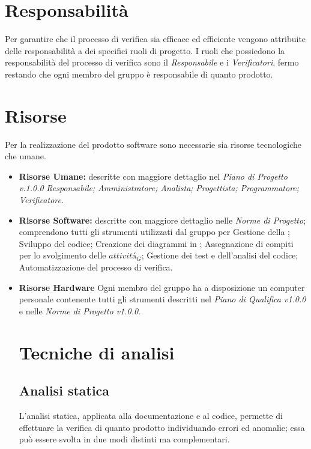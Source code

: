\section{Responsabilità}
Per garantire che il processo di verifica sia efficace ed efficiente vengono attribuite delle responsabilità a dei specifici ruoli di progetto.
I ruoli che possiedono la responsabilità del processo di verifica sono il \textit{Responsabile} e i \textit{Verificatori}, fermo restando che ogni membro del gruppo è responsabile di quanto prodotto.
\section{Risorse} Per la realizzazione del prodotto software sono necessarie sia risorse tecnologiche che umane.
\begin{itemize}
	\item \textbf{Risorse Umane:} descritte con maggiore dettaglio nel \textit{Piano di Progetto v.1.0.0}
	\subitem	\textit{Responsabile;}
	\subitem	\textit{Amministratore;}
	\subitem	\textit{Analista;}
	\subitem	\textit{Progettista;}
	\subitem	\textit{Programmatore;}
	\subitem	\textit{Verificatore.}
	
	\item \textbf{Risorse Software:} descritte con maggiore dettaglio nelle \textit{Norme di Progetto}; comprendono tutti gli strumenti utilizzati dal gruppo per
	\subitem Gestione della ;
	\subitem Sviluppo del codice;
	\subitem Creazione dei diagrammi in ;
	\subitem Assegnazione di compiti per lo svolgimento delle $\textit{attivit\'a}_G$;
	\subitem Gestione dei test e dell'analisi del codice;
	\subitem Automatizzazione del processo di verifica.

	\item \textbf{Risorse Hardware}
	Ogni membro del gruppo ha a disposizione un computer personale contenente tutti gli strumenti descritti nel \textit{Piano di Qualifica v1.0.0} e nelle 
	\textit{Norme di Progetto v1.0.0}.
	
\section{Tecniche di analisi}
\subsection{Analisi statica} \label{AnalisiStatica}
L’analisi statica, applicata alla documentazione e al
codice, permette di effettuare la verifica di quanto prodotto individuando errori ed
anomalie; essa può essere svolta in due modi distinti ma complementari.


\end{itemize}
